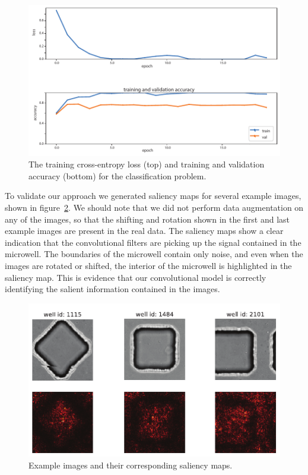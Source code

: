 \documentclass[10pt,twocolumn,letterpaper]{article}
\begin{document}
 \begin{figure}[t!]
\begin{center}
\includegraphics[width=0.8\linewidth]{figures/classification/classification_train_loss_train_and_val_loss.pdf}
\end{center}
   \caption{The training cross-entropy loss (top) and training and validation accuracy (bottom) for the classification problem.}
\label{classification_train_loss_train_and_val_loss}
\end{figure}

To validate our approach we generated saliency maps for several example images, shown in figure~\ref{saliency_maps}.  We should note that we did not perform data augmentation on any of the images, so that the shifting and rotation shown in the first and last example images are present in the real data.     The saliency maps show a clear indication that the convolutional filters are picking up the signal contained in the microwell.  The boundaries of the microwell contain only noise, and even when the images are rotated or shifted, the interior of the microwell is highlighted in the saliency map.  This is evidence that our convolutional model is correctly identifying the salient information contained in the images.

 \begin{figure}[b!]
\begin{center}
 \includegraphics[width=0.9\linewidth]{figures/saliency_maps.pdf}
\end{center}
   \caption{Example images and their corresponding saliency maps.}
\label{saliency_maps}
\end{figure}
\end{document}
